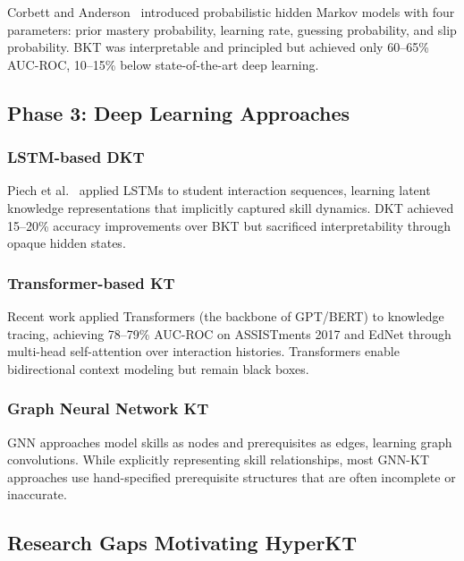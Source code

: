 \documentclass[10pt,twocolumn]{article}
\begin{document}
Corbett and Anderson~\cite{corbett1994} introduced probabilistic hidden Markov models with four parameters: prior mastery probability, learning rate, guessing probability, and slip probability. BKT was interpretable and principled but achieved only 60--65\% AUC-ROC, 10--15\% below state-of-the-art deep learning.

\subsection{Phase 3: Deep Learning Approaches}

\subsubsection{LSTM-based DKT}
Piech et al.~\cite{piech2015} applied LSTMs to student interaction sequences, learning latent knowledge representations that implicitly captured skill dynamics. DKT achieved 15--20\% accuracy improvements over BKT but sacrificed interpretability through opaque hidden states.

\subsubsection{Transformer-based KT}
Recent work applied Transformers (the backbone of GPT/BERT) to knowledge tracing, achieving 78--79\% AUC-ROC on ASSISTments 2017 and EdNet through multi-head self-attention over interaction histories. Transformers enable bidirectional context modeling but remain black boxes.

\subsubsection{Graph Neural Network KT}
GNN approaches model skills as nodes and prerequisites as edges, learning graph convolutions. While explicitly representing skill relationships, most GNN-KT approaches use hand-specified prerequisite structures that are often incomplete or inaccurate.

\subsection{Research Gaps Motivating HyperKT}
\end{document}
